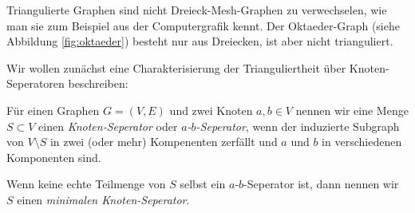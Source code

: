 \documentclass[../main.tex]{subfiles}
\begin{document}
\begin{bemerkung}
    Triangulierte Graphen sind nicht Dreieck-Mesh-Graphen zu verwechselen, wie man sie zum Beispiel aus der Computergrafik kennt. Der Oktaeder-Graph (siehe Abbildung \ref{fig:oktaeder}) besteht nur aus Dreiecken, ist aber nicht trianguliert.
\end{bemerkung}

Wir wollen zunächst eine Charakterisierung der Trianguliertheit über Knoten-Seperatoren beschreiben:

\begin{definition}\label{def:seperator}
    Für einen Graphen $G = (V, E)$ und zwei Knoten $a, b \in V$ nennen wir eine Menge $S \subset V$ einen \emph{Knoten-Seperator} oder \emph{$a$-$b$-Seperator}, wenn der induzierte Subgraph von $V \setminus S$ in zwei (oder mehr) Kompenenten zerfällt und $a$ und $b$ in verschiedenen Komponenten sind.
    
    Wenn keine echte Teilmenge von $S$ selbst ein $a$-$b$-Seperator ist, dann nennen wir $S$ einen \emph{minimalen Knoten-Seperator}.
\end{definition}
\end{document}
